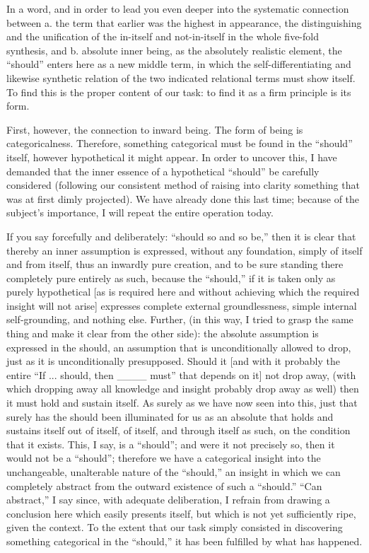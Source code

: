 In a word, and in order to lead you
even deeper into the systematic connection between
a. the term that earlier was the highest in appearance,
the distinguishing and the unification of
the in-itself and not-in-itself
in the whole five-fold synthesis, and
b. absolute inner being,
as the absolutely realistic element,
the “should” enters here as a new middle term,
in which the self-differentiating
and likewise synthetic relation
of the two indicated relational terms must show itself.
To find this is the proper content of our task:
to find it as a firm principle is its form.

First, however, the connection to inward being.
The form of being is categoricalness.
Therefore, something categorical must be found
in the “should” itself,
however hypothetical it might appear.
In order to uncover this,
I have demanded that the inner essence
of a hypothetical “should” be carefully considered
(following our consistent method of raising into clarity
something that was at first dimly projected).
We have already done this last time;
because of the subject's importance,
I will repeat the entire operation today.

If you say forcefully and deliberately:
“should so and so be,” then it is clear that
thereby an inner assumption is expressed,
without any foundation, simply of itself and from itself,
thus an inwardly pure creation,
and to be sure standing there completely pure entirely as such,
because the “should,” if it is taken only as purely hypothetical
[as is required here and without achieving which
the required insight will not arise]
expresses complete external groundlessness,
simple internal self-grounding, and nothing else.
Further, (in this way, I tried to grasp the same thing
and make it clear from the other side):
the absolute assumption is expressed in the should,
an assumption that is unconditionally allowed to drop,
just as it is unconditionally presupposed.
Should it [and with it probably the entire
“If ... should, then ____ must”
that depends on it] not drop away,
(with which dropping away all knowledge and insight
probably drop away as well)
then it must hold and sustain itself.
As surely as we have now seen into this,
just that surely has the should been illuminated
for us as an absolute that holds and sustains itself
out of itself, of itself, and through itself as such,
on the condition that it exists.
This, I say, is a “should”;
and were it not precisely so,
then it would not be a “should”;
therefore we have a categorical insight
into the unchangeable, unalterable nature of the “should,”
an insight in which we can completely abstract
from the outward existence of such a “should.”
“Can abstract,” I say since, with adequate deliberation,
I refrain from drawing a conclusion here
which easily presents itself,
but which is not yet sufficiently ripe, given the context.
To the extent that our task simply consisted
in discovering something categorical in the “should,”
it has been fulfilled by what has happened.

